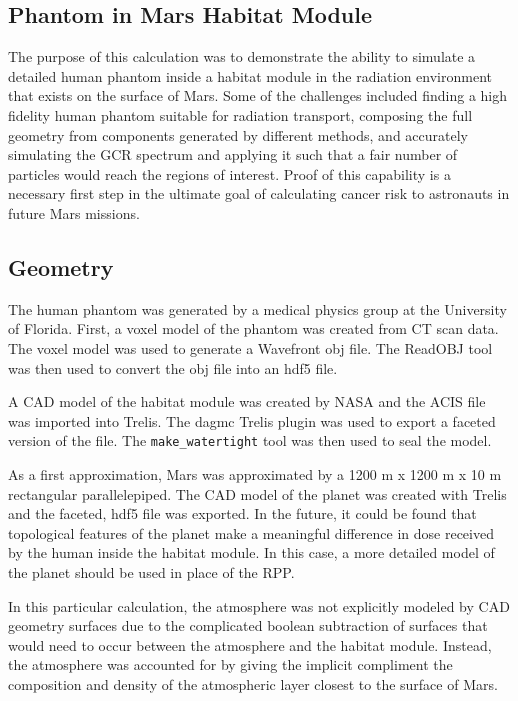 
\subsection{Phantom in Mars Habitat Module}
The purpose of this calculation was to demonstrate the ability to simulate a detailed
human phantom inside a habitat module in the radiation environment that exists on the
surface of Mars.  Some of the challenges included finding a high fidelity human phantom
suitable for radiation transport, composing the full geometry from components generated
by different methods, and accurately simulating the GCR spectrum and applying it such
that a fair number of particles would reach the regions of interest. Proof of this
capability is a necessary first step in the ultimate goal of calculating cancer risk
to astronauts in future Mars missions.

\subsection*{Geometry}
The human phantom was generated by a medical physics group at the University of Florida.
First, a voxel model of the phantom was created from CT scan data.  The voxel model
was used to generate a Wavefront obj file.  The ReadOBJ tool was then used to convert
the obj file into an hdf5 file.  

A CAD model of the habitat module was created by NASA and the ACIS file was imported 
into Trelis.  The dagmc Trelis plugin was used to export a faceted version of the file.
The \texttt{make\_watertight} tool was then used to seal the model.

As a first approximation, Mars was approximated by a 1200 m x 1200 m x 10 m rectangular
parallelepiped.  The CAD model of the planet was created with Trelis and the faceted,
hdf5 file was exported.  In the future, it could be found that topological features of
the planet make a meaningful difference in dose received by the human inside the 
habitat module.  In this case, a more detailed model of the planet should be used in 
place of the RPP.

In this particular calculation, the atmosphere was not explicitly modeled by CAD geometry
surfaces due to the complicated boolean subtraction of surfaces that would need to occur
between the atmosphere and the habitat module.  Instead, the atmosphere was accounted 
for by giving the implicit compliment the composition and density of the atmospheric layer
closest to the surface of Mars.

